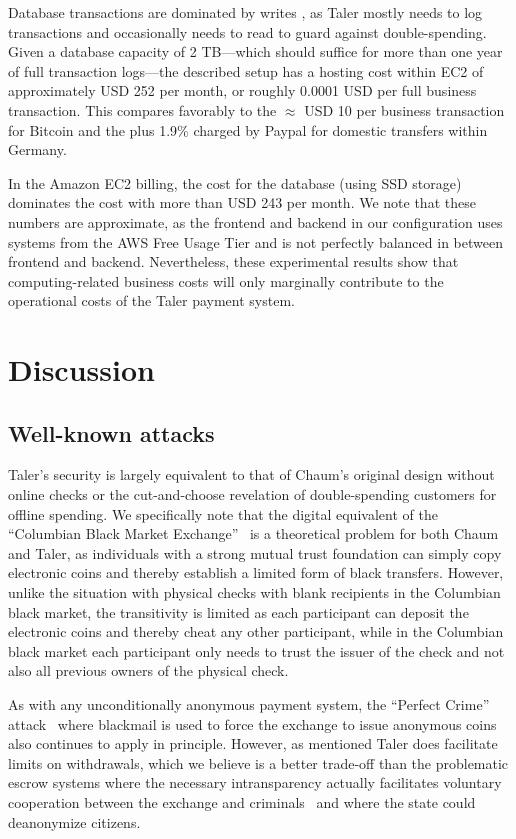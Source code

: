 \documentclass{llncs}
\begin{document}
Database transactions are dominated by writes%
, as Taler mostly needs to log
transactions and occasionally needs to read to guard against
double-spending.  Given a database capacity of 2 TB---which should
suffice for more than one year of full transaction logs---the
described setup has a hosting cost within EC2 of approximately USD 252
per month, or roughly 0.0001 USD per full business transaction.  This
compares favorably to the $\approx$ USD 10 per business transaction
for Bitcoin and the  plus 1.9\% charged by Paypal for
domestic transfers within Germany.

In the Amazon EC2 billing, the cost for the database (using SSD
storage) dominates the cost with more than USD 243 per month.  We note
that these numbers are approximate, as the frontend and backend in our
configuration uses systems from the AWS Free Usage Tier and is not
perfectly balanced in between frontend and backend.  Nevertheless,
these experimental results show that computing-related business costs
will only marginally contribute to the operational costs of the Taler
payment system.


\section{Discussion}

\subsection{Well-known attacks}

Taler's security is largely equivalent to that of Chaum's original
design without online checks or the cut-and-choose revelation of
double-spending customers for offline spending.
We specifically note that the digital equivalent of the ``Columbian
Black Market Exchange''~\cite{fatf1997} is a theoretical problem for
both Chaum and Taler, as individuals with a strong mutual trust
foundation can simply copy electronic coins and thereby establish a
limited form of black transfers.  However, unlike the situation with
physical checks with blank recipients in the Columbian black market,
the transitivity is limited as each participant can deposit the electronic
coins and thereby cheat any other participant, while in the Columbian
black market each participant only needs to trust the issuer of the
check and not also all previous owners of the physical check.

As with any unconditionally anonymous payment system, the ``Perfect
Crime'' attack~\cite{solms1992perfect} where blackmail is used to
force the exchange to issue anonymous coins also continues to apply in
principle.  However, as mentioned Taler does facilitate limits on
withdrawals, which we believe is a better trade-off than the
problematic escrow systems where the necessary intransparency
actually facilitates voluntary cooperation between the exchange and
criminals~\cite{sander1999escrow} and where the state could
deanonymize citizens.
\end{document}
